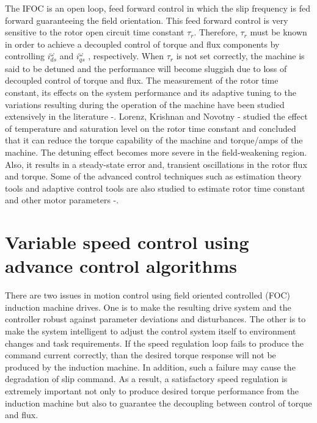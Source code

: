 The IFOC is an open loop, feed forward control in which the slip frequency is fed forward guaranteeing the field orientation. This feed forward control is very sensitive to the rotor open circuit time constant $\tau_{r}$. Therefore, $\tau_{r}$ must be known in order to achieve a decoupled control of torque and flux components by controlling $i_{ds}^{\omega}$ and $i_{qs}^{\omega}$ , respectively. When $\tau_{r}$ is not set correctly, the machine is said to be detuned and the performance will become sluggish due to loss of decoupled control of torque and flux. The measurement of the rotor time constant, its effects on the system performance and its adaptive tuning to the variations resulting during the operation of the machine have been studied extensively in the literature \cite{rl}-\cite{krisn}. Lorenz, Krishnan and Novotny \cite{rl}-\cite{krisn} studied the effect of temperature and saturation level on the rotor time constant and concluded that it can reduce the torque capability of the machine and torque/amps of the machine. The detuning effect becomes more severe in the field-weakening region. Also, it results in a steady-state error and, transient oscillations in the rotor flux and torque. Some of the advanced control techniques such as estimation theory tools and adaptive control tools are also studied to estimate rotor time constant and other motor parameters \cite{ca}-\cite{jm}.\\


\section{Variable speed control using advance control algorithms}

There are two issues in motion control using field oriented controlled (FOC) induction machine drives. One is to make the resulting drive system and the controller robust against parameter deviations and disturbances. The other is to make the system intelligent to adjust the control system itself to environment changes and task requirements. If the speed regulation loop fails to produce the command current correctly, than the desired torque response will not be produced by the induction machine. In addition, such a failure may cause the degradation of slip command. As a result, a satisfactory speed regulation is extremely important not only to produce desired torque performance from the induction machine but also to guarantee the decoupling between control of torque and flux.\\

